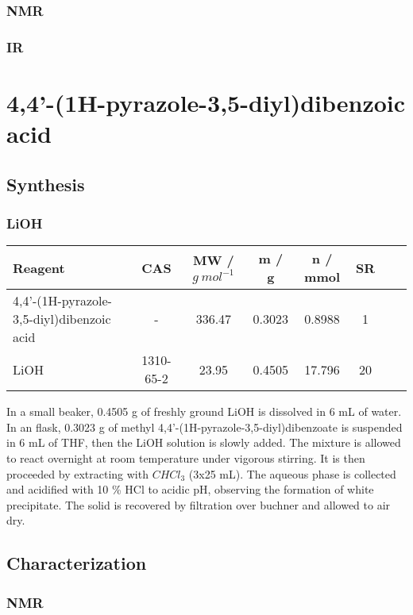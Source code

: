 \documentclass[../Master.tex]{subfiles}
\begin{document}
\subsubsection{NMR}
\subsubsection{IR}

\newpage \section{4,4'-(1H-pyrazole-3,5-diyl)dibenzoic acid}
\subsection{Synthesis}
\subsubsection{LiOH}
\begin{center}
	\begin{tabular}[b]{lccccccc}
		\toprule
		Reagent                                   & CAS       & MW / \(g \ mol^{-1}\) & m / g  & n / mmol & SR \\
		\midrule
		4,4'-(1H-pyrazole-3,5-diyl)dibenzoic acid & -         & 336.47                & 0.3023 & 0.8988   & 1  \\
		LiOH                                      & 1310-65-2 & 23.95                 & 0.4505 & 17.796   & 20 \\
		\bottomrule
	\end{tabular}
\end{center}

In a small beaker, 0.4505 g of freshly ground LiOH is dissolved in 6 mL of water. In an flask, 0.3023 g of methyl 4,4'-(1H-pyrazole-3,5-diyl)dibenzoate is suspended in 6 mL of THF, then the LiOH solution is slowly added. The mixture is allowed to react overnight at room temperature under vigorous stirring. It is then proceeded by extracting with \(CHCl_{3}\) (3x25 mL). The aqueous phase is collected and acidified with 10 \% HCl to acidic pH, observing the formation of white precipitate. The solid is recovered by filtration over buchner and allowed to air dry.

\newpage \subsection{Characterization}
\subsubsection{NMR}
\end{document}
